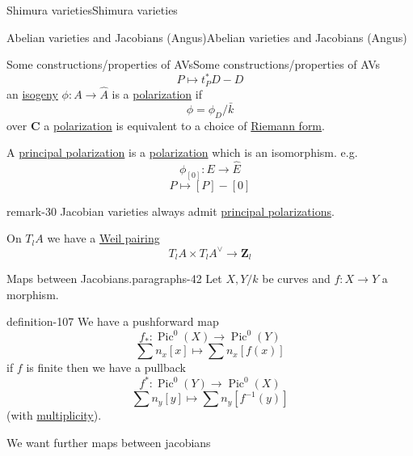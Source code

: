 \documentclass[10pt,]{book}
\numberwithin{equation}{section}
\newcommand{\inv}{^{-1}}
\newcommand{\ZZ}{\mathbf{Z}}
\newcommand{\CC}{\mathbf{C}}
\DeclareMathOperator{\Pic}{Pic}
\begin{document}
\begin{chapterptx}{Shimura varieties}{}{Shimura varieties}{}{}
\begin{sectionptx}{Abelian varieties and Jacobians (Angus)}{}{Abelian varieties and Jacobians (Angus)}{}{}
\begin{subsectionptx}{Some constructions/properties of AVs}{}{Some constructions/properties of AVs}{}{}
%
\begin{equation*}
P \mapsto t_P^* D -D
\end{equation*}
an \hyperref[def-supersing-isog-isog]{isogeny} \(\phi\colon A\to \hat A\) is a \hyperref[def-polarization]{polarization} if%
\begin{equation*}
\phi =  \phi_D /\bar k
\end{equation*}
over \(\CC\)  a \hyperref[def-polarization]{polarization} is equivalent to a choice of \hyperref[def-riemann-form]{Riemann form}.%
\par
\hypertarget{p-1112}{}%
A \hyperref[def-polarization]{principal polarization} is a \hyperref[def-polarization]{polarization} which is an isomorphism. e.g.%
\begin{equation*}
\phi_{[0]} \colon E \to \hat E
\end{equation*}
%
\begin{equation*}
P \mapsto [P] - [0]
\end{equation*}
%
\begin{remark}{}{remark-30}%
\hypertarget{p-1113}{}%
Jacobian varieties always admit \hyperref[def-polarization]{principal polarizations}.%
\end{remark}
\hypertarget{p-1114}{}%
On \(T_lA \) we have  a \hyperref[prop-weil-pair]{Weil pairing}%
\begin{equation*}
T_lA \times T_lA^\vee \to \ZZ_l
\end{equation*}
%
\begin{paragraphs}{Maps between Jacobians.}{paragraphs-42}%
\hypertarget{p-1115}{}%
Let \(X,Y/k\) be curves and \(f\colon X \to Y\) a morphism.%
\begin{definition}{}{definition-107}%
\hypertarget{p-1116}{}%
We have a pushforward map%
\begin{equation*}
f_*\colon \Pic^0(X) \to \Pic^0(Y)
\end{equation*}
%
\begin{equation*}
\sum n_x [x] \mapsto \sum n_x[f(x)]
\end{equation*}
if \(f\) is finite then we have  a pullback%
\begin{equation*}
f^* \colon \Pic^0(Y) \to \Pic^0(X)
\end{equation*}
%
\begin{equation*}
\sum n_y[y] \mapsto \sum n_y [f\inv (y)]
\end{equation*}
(with \hyperref[def-riem-order-vanish]{multiplicity}).%
\end{definition}
\hypertarget{p-1117}{}%
We want further maps between jacobians%

\end{paragraphs}
\end{subsectionptx}
\end{sectionptx}
\end{chapterptx}
\end{document}

